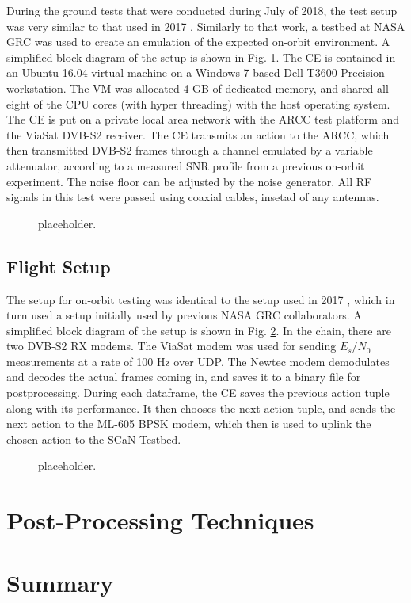 \par During the ground tests that were conducted during July of 2018, the test setup was very similar to that used in 2017 \cite{tim_implementation}.  Similarly to that work, a testbed at NASA GRC was used to create an emulation of the expected on-orbit environment. A simplified block diagram of the setup is shown in Fig. \ref{methods:groundTestFig}. The CE is contained in an Ubuntu 16.04 virtual machine on a Windows 7-based Dell T3600 Precision workstation. The VM was allocated 4 GB of dedicated memory, and shared all eight of the CPU cores (with hyper threading) with the host operating system. The CE is put on a private local area network with the ARCC test platform and the ViaSat DVB-S2 receiver. The CE transmits an action to the ARCC, which then transmitted DVB-S2 frames through a channel emulated by a variable attenuator, according to a measured SNR profile from a previous on-orbit experiment. The noise floor can be adjusted by the noise generator. All RF signals in this test were passed using coaxial cables, insetad of any antennas.
\begin{figure}[ht]
\caption{placeholder.}\label{methods:groundTestFig}
\end{figure} 

\subsection{Flight Setup}
\par The setup for on-orbit testing was identical to the setup used in 2017 \cite{tim_implementation}, which in turn used a setup initially used by previous NASA GRC collaborators. A simplified block diagram of the setup is shown in Fig. \ref{methods:flightTestFig}. In the chain, there are two DVB-S2 RX modems. The ViaSat modem was used for sending $E_s/N_0$ measurements at a rate of 100 Hz over UDP. The Newtec modem demodulates and decodes the actual frames coming in, and saves it to a binary file for postprocessing. During each dataframe, the CE saves the previous action tuple along with its performance. It then chooses the next action tuple, and sends the next action to the ML-605 BPSK modem, which then is used to uplink the chosen action to the SCaN Testbed.

\begin{figure}[ht]
\caption{placeholder.}\label{methods:flightTestFig}
\end{figure} 

\section{Post-Processing Techniques}

\section{Summary}
